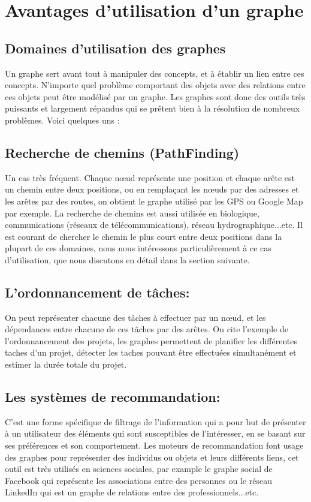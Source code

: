 	
	
\section{Avantages d'utilisation d'un graphe}
\subsection{Domaines d'utilisation des graphes}
Un graphe sert avant tout à manipuler des concepts, et à établir un lien entre ces concepts. N'importe quel problème comportant des objets avec des relations entre ces objets peut être modélisé par un graphe.
Les graphes sont donc des outils très puissants et largement répandus qui se prêtent bien à la résolution de nombreux problèmes. Voici quelques uns :

\subsection{Recherche de chemins (PathFinding)}
Un cas très fréquent. Chaque nœud représente une position et chaque arête est un chemin entre deux positions, ou en remplaçant les nœuds par des adresses et les arêtes par des routes, on obtient le graphe utilisé par les GPS ou Google Map par exemple.
La recherche de chemins est aussi utilisée en biologique, communications (réseaux de télécommunications), réseau hydrographique...etc.
Il est courant de chercher le chemin le plus court entre deux positions dans la plupart de ces domaines, nous nous intéressons particulièrement à ce cas d'utilisation, que nous discutons en détail dans la section suivante.


\subsection{L'ordonnancement de tâches:}
On peut représenter chacune des tâches à effectuer par un nœud, et les dépendances entre chacune de ces tâches par des arêtes.
On cite l'exemple de l'ordonnancement des projets, les graphes permettent de planifier les différentes taches d'un projet, détecter les taches pouvant être effectuées simultanément et estimer la durée totale du projet.

\subsection{Les systèmes de recommandation:}
C'est une forme spécifique de filtrage de l'information qui a pour but de présenter à un utilisateur des éléments qui sont susceptibles de l'intéresser, en se basant sur ses préférences et son comportement.
Les moteurs de recommandation font usage des graphes pour représenter des individus ou objets et leurs différents liens, cet outil est très utilisés en sciences sociales, par example le graphe social de Facebook qui représente les associations entre des personnes ou le réseau LinkedIn qui est un graphe de relations entre des professionnels...etc.

